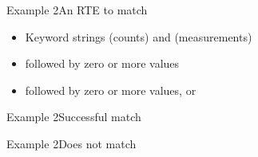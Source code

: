 \begin{frame}{Example 2}{An RTE to match}
  \usebox\exampleAbox

  \begin{itemize}
  \item Keyword strings  (counts) and  (measurements)
  \item {} followed by zero or more  values
  \item {} followed by zero or more values,  or 
  \end{itemize}
\end{frame}

\newsavebox\exampleAbbox
\begin{lrbox}{\exampleAbbox}
  \begin{minipage}{12cm}
    
  \end{minipage}
\end{lrbox}



\begin{frame}{Example 2}{Successful match}
  \usebox\exampleAbbox
\end{frame}

\newsavebox\exampleAcbox
\begin{lrbox}{\exampleAcbox}
  \begin{minipage}{12cm}
    
  \end{minipage}
\end{lrbox}



\begin{frame}{Example 2}{Does not match}
  \usebox\exampleAcbox
\end{frame}

\newsavebox\exampleAdbox
\begin{lrbox}{\exampleAdbox}
  \begin{minipage}{12cm}
    
  \end{minipage}
\end{lrbox}


  




